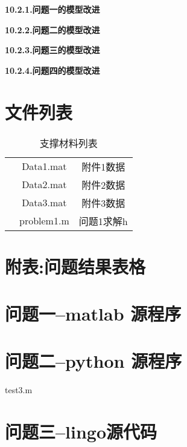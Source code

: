 \documentclass{cumcmthesis}
\begin{document}
	\noindent\textbf{10.2.1.问题一的模型改进}
	
	\noindent\textbf{10.2.2.问题二的模型改进}
	
	\noindent\textbf{10.2.3.问题三的模型改进}
	
	\noindent\textbf{10.2.4.问题四的模型改进}
	
	\cite{s}
	
	\newpage
	\begin{appendices}
		\section{文件列表}
		\begin{table*}[htbp]
			\renewcommand\arraystretch{0.1}
			\centering
			\caption{支撑材料列表}
			\begin{tabular}{ccc}
				\toprule[1.5pt]
				\makebox[0.27\textwidth][c]{文件夹名}	& \makebox[0.3\textwidth][c]{文件夹内容}	& \makebox[0.4\textwidth][c]{文件描述} \\ 
				\midrule
			&	Data1.mat & 附件1数据 \\
			&	Data2.mat & 附件2数据 \\
			&	Data3.mat & 附件3数据 \\
			&	problem1.m & 问题1求解h \\
				\bottomrule
			\end{tabular}%
			\label{tab:addlabel}%
		\end{table*}%

		
		\section{附表:问题结果表格}

		\section{问题一--matlab 源程序}
		
		
		\section{问题二--python 源程序}
		test3.m
		
		
		\section{问题三--lingo源代码}
		
		
	\end{appendices}
\end{document}
